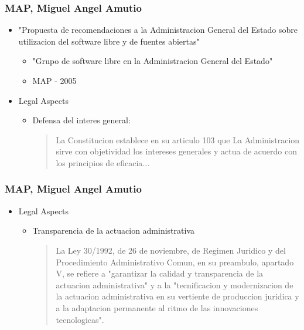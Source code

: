\documentclass{beamer}
\begin{document}
\begin{frame}
\frametitle{ MAP, Miguel Angel Amutio}

\begin{itemize}
\item "Propuesta de recomendaciones a la Administracion General del Estado sobre utilizacion del software libre y de fuentes abiertas"
\begin {itemize}
	\item "Grupo de software libre en la Administracion General del Estado"
	\item  MAP - 2005
\end {itemize}
\item Legal Aspects
\begin {itemize}
	\item Defensa del interes general:
	\begin{quote} 
	La Constitucion establece en su articulo 103 que La Administracion sirve con objetividad los intereses generales y actua de acuerdo con los principios de eficacia...
	\end{quote}
\end {itemize}
\end{itemize}

\end{frame}



\begin{frame}
\frametitle{ MAP, Miguel Angel Amutio}

\begin{itemize}
\item Legal Aspects
\begin {itemize}
	\item Transparencia de la actuacion administrativa
	\begin{quote} 
	La Ley 30/1992, de 26 de noviembre, de Regimen Juridico y del Procedimiento Administrativo Comun, en su preambulo,
apartado V, se refiere a "garantizar la calidad y transparencia de la actuacion administrativa" y a la "tecnificacion y
modernizacion de la actuacion administrativa en su vertiente de produccion juridica y a la adaptacion permanente al ritmo de las
innovaciones tecnologicas".

	\end{quote}
\end {itemize}
\end{itemize}

\end{frame}
\end{document}
